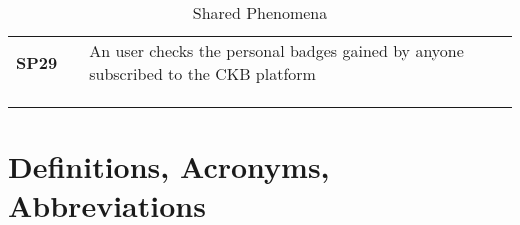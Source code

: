 \begin{longtable}[H]{l l p{8.5cm} l l}
    \textbf{SP29}  & \vline & An user checks the personal badges gained by anyone subscribed to the CKB platform                                              & \vline &                        \\
                   &        &                                                                                                                                 &        &                        \\
    \hline         &        &                                                                                                                                 &        &                        \\
    \caption{Shared Phenomena}
\end{longtable}

\section{Definitions, Acronyms, Abbreviations}

